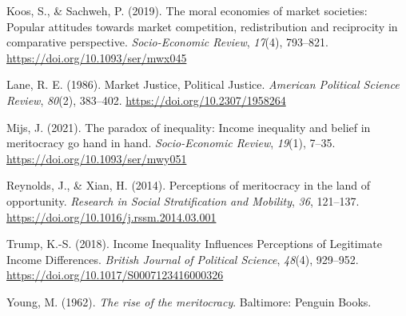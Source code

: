 \documentclass[
  12pt,
  letterpaper,
  DIV=11,
  numbers=noendperiod]{scrartcl}
\newlength{\cslhangindent}
\newenvironment{CSLReferences}[2] %
 {\begin{list}{}{%
  \setlength{\itemindent}{0pt}
  \setlength{\leftmargin}{0pt}
  \setlength{\parsep}{0pt}
  \ifodd #1
   \setlength{\leftmargin}{\cslhangindent}
   \setlength{\itemindent}{-1\cslhangindent}
  \fi
  \setlength{\itemsep}{#2\baselineskip}}}
 {\end{list}}
\begin{document}
\begin{CSLReferences}{1}{0}
Koos, S., \& Sachweh, P. (2019). The moral economies of market
societies: Popular attitudes towards market competition, redistribution
and reciprocity in comparative perspective. \emph{Socio-Economic
Review}, \emph{17}(4), 793--821.
\url{https://doi.org/10.1093/ser/mwx045}

Lane, R. E. (1986). Market {Justice}, {Political Justice}.
\emph{American Political Science Review}, \emph{80}(2), 383--402.
\url{https://doi.org/10.2307/1958264}

Mijs, J. (2021). The paradox of inequality: Income inequality and belief
in meritocracy go hand in hand. \emph{Socio-Economic Review},
\emph{19}(1), 7--35. \url{https://doi.org/10.1093/ser/mwy051}

Reynolds, J., \& Xian, H. (2014). Perceptions of meritocracy in the land
of opportunity. \emph{Research in Social Stratification and Mobility},
\emph{36}, 121--137. \url{https://doi.org/10.1016/j.rssm.2014.03.001}

Trump, K.-S. (2018). Income {Inequality Influences Perceptions} of
{Legitimate Income Differences}. \emph{British Journal of Political
Science}, \emph{48}(4), 929--952.
\url{https://doi.org/10.1017/S0007123416000326}

Young, M. (1962). \emph{The rise of the meritocracy}. Baltimore: Penguin
Books.

\end{CSLReferences}
\end{document}
